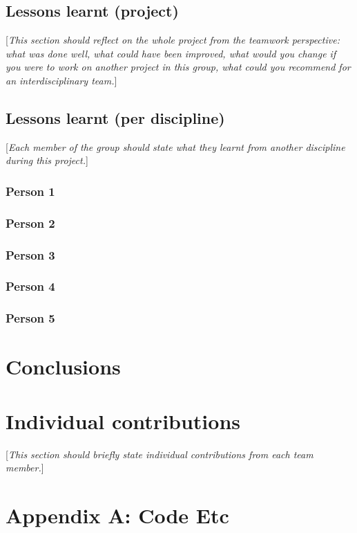 \documentclass[10pt,english, openany]{book}
\begin{document}
\section{Lessons learnt (project)}
[\textit{This section should reflect on the whole project from the teamwork perspective: what was done well, what could have been improved, what would you change if you were to work on another project in this group, what could you recommend for an interdisciplinary team.}]

\section{Lessons learnt (per discipline)}
[\textit{Each member of the group should state what they learnt from another discipline during this project.}]
\subsection{Person 1}
\subsection{Person 2}
\subsection{Person 3}
\subsection{Person 4}
\subsection{Person 5}

\chapter{Conclusions}

\chapter{Individual contributions}
[\textit{This section should briefly state individual contributions from each team member.}]

\pagebreak





\pagebreak

\chapter*{Appendix A: Code Etc}
\end{document}
